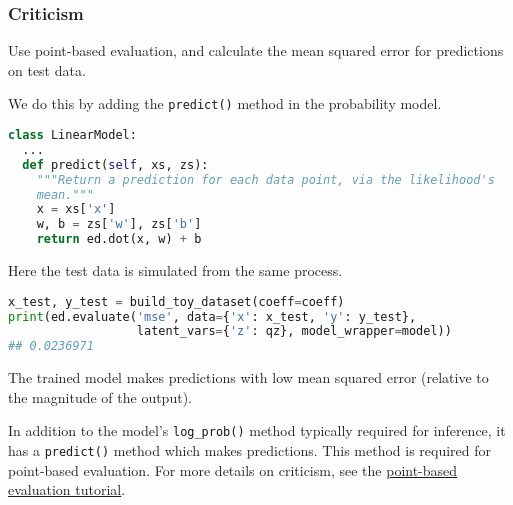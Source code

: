 \subsubsection{Criticism}

Use point-based evaluation, and calculate the mean squared
error for predictions on test data.

We do this by adding the \texttt{predict()} method in the
probability model.
\begin{lstlisting}[language=Python]
class LinearModel:
  ...
  def predict(self, xs, zs):
    """Return a prediction for each data point, via the likelihood's
    mean."""
    x = xs['x']
    w, b = zs['w'], zs['b']
    return ed.dot(x, w) + b
\end{lstlisting}

Here the test data is simulated from the same process.
\begin{lstlisting}[language=Python]
x_test, y_test = build_toy_dataset(coeff=coeff)
print(ed.evaluate('mse', data={'x': x_test, 'y': y_test},
                  latent_vars={'z': qz}, model_wrapper=model))
## 0.0236971
\end{lstlisting}

The trained model makes predictions with low mean squared error
(relative to the magnitude of the output).

In addition to the model's \texttt{log_prob()} method typically required for
inference, it has a \texttt{predict()} method which makes
predictions. This method is required for point-based evaluation. For
more details on criticism, see the \href{tut_point_eval.html}{point-based
evaluation tutorial}.
